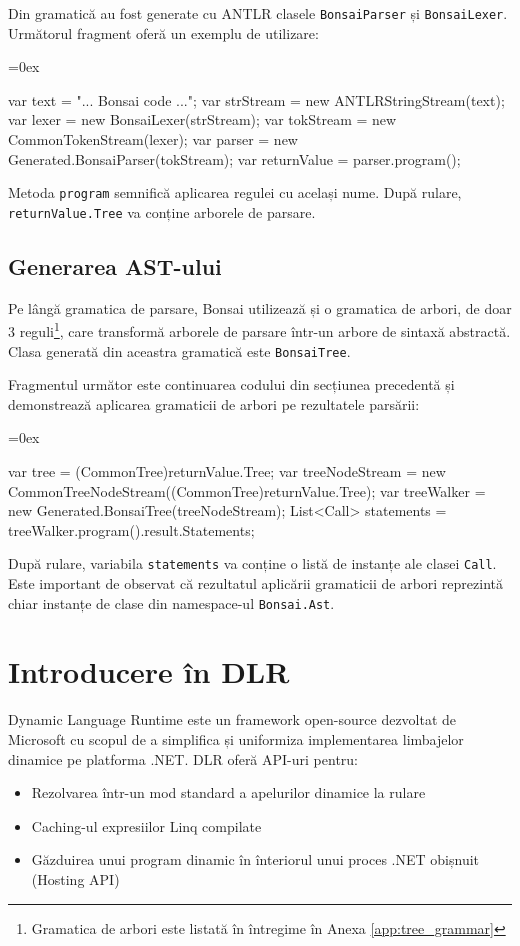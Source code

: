 \documentclass[12pt,a4paper]{memoir}
\renewcommand{\c}{\texttt}
\newenvironment{code}
{
\definecolor{shadecolor}{gray}{0.91}
\topsep=0ex
\relax
\shaded
\verbatim
}
{
\endverbatim
\endshaded
}
\begin{document}
Din gramatică au fost generate cu ANTLR clasele \c{BonsaiParser} și \c{BonsaiLexer}. Următorul fragment oferă un exemplu de utilizare:

\begin{code}
var text = "... Bonsai code ...";
var strStream = new ANTLRStringStream(text);
var lexer = new BonsaiLexer(strStream);
var tokStream = new CommonTokenStream(lexer);
var parser = new Generated.BonsaiParser(tokStream);
var returnValue = parser.program();
\end{code}

Metoda \c{program} semnifică aplicarea regulei cu același nume. După rulare, \c{returnValue.Tree} va conține arborele de parsare.

\section{Generarea AST-ului}

Pe lângă gramatica de parsare, Bonsai utilizează și o gramatica de arbori, de doar 3 reguli\footnote{Gramatica de arbori este listată în întregime în Anexa \ref{app:tree_grammar}}, care transformă arborele de parsare într-un arbore de sintaxă abstractă. Clasa generată din aceastra gramatică este \c{BonsaiTree}.

Fragmentul următor este continuarea codului din secțiunea precedentă și demonstrează aplicarea gramaticii de arbori pe rezultatele parsării:

\begin{code}
var tree = (CommonTree)returnValue.Tree;
var treeNodeStream = 
    new CommonTreeNodeStream((CommonTree)returnValue.Tree);
var treeWalker = new Generated.BonsaiTree(treeNodeStream);
List<Call> statements = treeWalker.program().result.Statements;
\end{code}

După rulare, variabila \c{statements} va conține o listă de instanțe ale clasei \c{Call}. Este important de observat că rezultatul aplicării gramaticii de arbori reprezintă chiar instanțe de clase din namespace-ul \c{Bonsai.Ast}.

\chapter{Introducere în DLR}

Dynamic Language Runtime\cite{dlr} este un framework open-source dezvoltat de Microsoft cu scopul de a simplifica și uniformiza implementarea limbajelor dinamice pe platforma .NET. DLR oferă API-uri pentru:
\begin{itemize}
\item Rezolvarea într-un mod standard a apelurilor dinamice la rulare
\item Caching-ul expresiilor Linq compilate
\item Găzduirea unui program dinamic în înteriorul unui proces .NET obișnuit (Hosting API)
\end{itemize}
\end{document}
